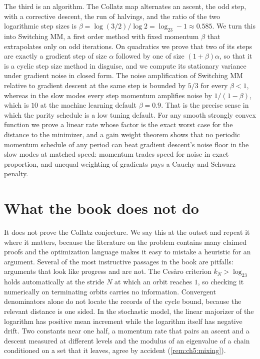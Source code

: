 The third is an algorithm. The Collatz map alternates an ascent, the odd step,
with a corrective descent, the run of halvings, and the ratio of the two
logarithmic step sizes is $\beta=\log(3/2)/\log2=\log_23-1\approx0.585$. We
turn this into Switching MM, a first order method with fixed momentum $\beta$
that extrapolates only on odd iterations. On quadratics we prove that two of
its steps are exactly a gradient step of size $\alpha$ followed by one of size
$(1+\beta)\alpha$, so that it is a cyclic step size method in disguise, and we
compute its stationary variance under gradient noise in closed form. The
noise amplification of Switching MM relative to gradient descent at the same step is bounded by $5/3$ for every $\beta<1$,
whereas in the slow modes every step momentum amplifies noise by $1/(1-\beta)$, which is $10$ at
the machine learning default $\beta=0.9$. That is the precise sense in which
the parity schedule is a low tuning default. For any smooth strongly convex
function we prove a linear rate whose factor is the exact worst case for the distance to the minimizer, and a gain weight theorem shows that no periodic
momentum schedule of any period can beat gradient descent's noise floor in the slow modes at
matched speed: momentum trades speed for noise in exact proportion, and unequal
weighting of gradients pays a Cauchy and Schwarz penalty.

\section*{What the book does not do}

It does not prove the Collatz conjecture. We say this at the outset and repeat
it where it matters, because the literature on the problem contains many
claimed proofs and the optimization language makes it easy to mistake a
heuristic for an argument. Several of the most instructive passages in the
book are pitfalls: arguments that look like progress and are not. The Ces\`aro
criterion $\bar k_N>\log_23$ holds automatically at the stride $N$ at which an orbit reaches $1$,
so checking it numerically on terminating orbits carries no information. Convergent
denominators alone do not locate the records of the cycle bound, because the
relevant distance is one sided. In the stochastic model, the linear majorizer of the logarithm has positive mean increment while the logarithm itself has negative drift.
Two constants near one half, a momentum rate that pairs an ascent and a descent measured at different levels and the modulus of an eigenvalue of a chain conditioned on a set that it leaves, agree by accident (\cref{rem:ch5:mixing}).

